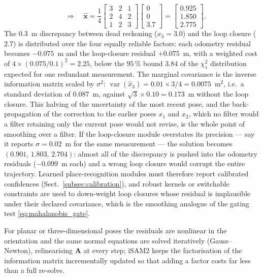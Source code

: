 \documentclass[graybox,envcountchap]{style/SNmono}
\providecommand{\DIFadd}[1]{{\protect\color{blue} #1}} %
\providecommand{\DIFdel}[1]{{\protect\color{red} #1}} %
\providecommand{\DIFaddbegin}{} %
\providecommand{\DIFaddend}{} %
\providecommand{\DIFdelbegin}{} %
\providecommand{\DIFdelend}{} %
\begin{document}
\begin{example}
\begin{equation*}
\quad\Longrightarrow\quad
\widehat{\mathbf{x}}=\frac{1}{4}\begin{bmatrix}3&2&1\\2&4&2\\1&2&3\end{bmatrix}\begin{bmatrix}0\\0\\3.7\end{bmatrix}
=\begin{bmatrix}0.925\\1.850\\2.775\end{bmatrix}.
\end{equation*}
The $0.3$~m discrepancy between dead reckoning ($x_3=3.0$) and the loop closure ($2.7$) is distributed over the four equally reliable factors: each odometry residual becomes $-0.075$~m and the loop-closure residual $+0.075$~m, with a weighted cost of $4\times(0.075/0.1)^{2}=2.25$, below the $95\,\%$ bound $3.84$ of the $\chi^{2}_{1}$ distribution expected for one redundant measurement. The marginal covariance is the inverse information matrix scaled by $\sigma^{2}$: $\operatorname{var}(\widehat{x}_3)=0.01\times 3/4=0.0075$~m$^{2}$, i.e.\ a standard deviation of $0.087$~m, against $\sqrt{3}\times0.10=0.173$~m without the loop closure. This halving of the uncertainty of the most recent pose, and the back-propagation of the correction to the earlier poses $x_1$ and $x_2$, which \DIFdelbegin \DIFdel{no filter would }\DIFdelend \DIFaddbegin \DIFadd{a filter retaining only the current pose would not }\DIFaddend revise, is the whole point of smoothing over a filter. If the loop-closure module overstates its precision --- say it reports $\sigma=0.02$~m for the same measurement --- the solution becomes $(0.901,\,1.803,\,2.704)$: almost all of the discrepancy is pushed into the odometry residuals ($-0.099$~m each) and a wrong loop closure would corrupt the entire trajectory. Learned place-recognition modules must therefore report calibrated confidences (Sect.~\ref{subsec:calibration}), and robust kernels or switchable constraints are used to down-weight loop closures whose residual is implausible under their declared covariance, which is the smoothing analogue of the gating test \eqref{eq:mahalanobis_gate}.
\end{example}
For planar or three-dimensional poses the residuals are nonlinear in the orientation and the same normal equations are solved iteratively (Gauss--Newton), relinearising $\mathbf{A}$ at every step; iSAM2 \cite{kaess2012_isam2} keeps the factorisation of the information matrix incrementally updated so that adding a factor costs far less than a full re-solve.
\end{document}

